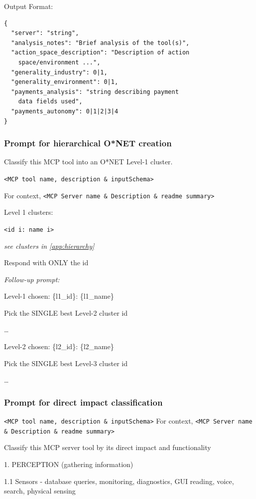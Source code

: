 \documentclass[manuscript,screen,nonacm,oneside]{acmart}
\begin{document}
Output Format:

\begin{lstlisting}
{
  "server": "string",
  "analysis_notes": "Brief analysis of the tool(s)",
  "action_space_description": "Description of action
    space/environment ...",
  "generality_industry": 0|1,
  "generality_environment": 0|1,
  "payments_analysis": "string describing payment
    data fields used",
  "payments_autonomy": 0|1|2|3|4
}
\end{lstlisting}

\subsubsection{Prompt for hierarchical O*NET creation}
\label{app:onet-prompt}

Classify this MCP tool into an O*NET Level-1 cluster.

\texttt{<MCP tool name, description \& inputSchema>} 

For context, \texttt{<MCP Server name \& Description \& readme summary>}

Level 1 clusters:

\texttt{<id i: name i>}

\textit{see clusters in \ref{app:hierarchy}}

Respond with ONLY the id

\textit{Follow-up prompt:}

Level-1 chosen: \{l1\_id\}: \{l1\_name\}

Pick the SINGLE best Level-2 cluster id

\ldots{}

Level-2 chosen: \{l2\_id\}: \{l2\_name\}

Pick the SINGLE best Level-3 cluster id

\ldots{}

\subsubsection{Prompt for direct impact classification}

\texttt{<MCP tool name, description \& inputSchema>} For context, \texttt{<MCP Server name \& Description \& readme summary>}

Classify this MCP server tool by its direct impact and functionality

1. PERCEPTION (gathering information)

1.1 Sensors - database queries, monitoring, diagnostics, GUI reading, voice, search, physical sensing
\end{document}
